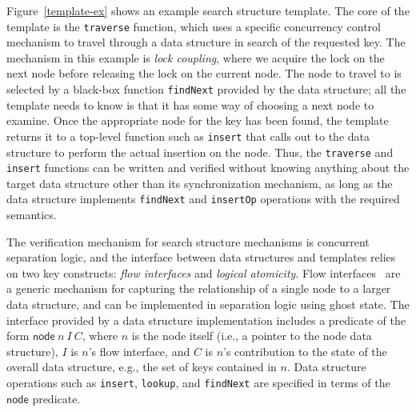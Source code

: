 \documentclass[sigplan,screen]{acmart}
\begin{document}
Figure~\ref{template-ex} shows an example search structure template. The core of the template is the \lstinline{traverse} function, which uses a specific concurrency control mechanism to travel through a data structure in search of the requested key. The mechanism in this example is \emph{lock coupling}, where we acquire the lock on the next node before releasing the lock on the current node. The node to travel to is selected by a black-box function \lstinline{findNext} provided by the data structure; all the template needs to know is that it has some way of choosing a next node to examine. Once the appropriate node for the key has been found, the template returns it to a top-level function such as \lstinline{insert} that calls out to the data structure to perform the actual insertion on the node. Thus, the \lstinline{traverse} and \lstinline{insert} functions can be written and verified without knowing anything about the target data structure other than its synchronization mechanism, as long as the data structure implements \lstinline{findNext} and \lstinline{insertOp} operations with the required semantics.

The verification mechanism for search structure mechanisms is concurrent separation logic, and the interface between data structures and templates relies on two key constructs: \emph{flow interfaces} and \emph{logical atomicity}. Flow interfaces~\cite{krishna2017flow} are a generic mechanism for capturing the relationship of a single node to a larger data structure, and can be implemented in separation logic using ghost state. The interface provided by a data structure implementation includes a predicate of the form $\mathsf{node}\ n\ I\ C$, where $n$ is the node itself (i.e., a pointer to the node data structure), $I$ is $n$'s flow interface, and $C$ is $n$'s contribution to the state of the overall data structure, e.g., the set of keys contained in $n$. Data structure operations such as \lstinline{insert}, \lstinline{lookup}, and \lstinline{findNext} are specified in terms of the $\mathsf{node}$ predicate. %
\end{document}

